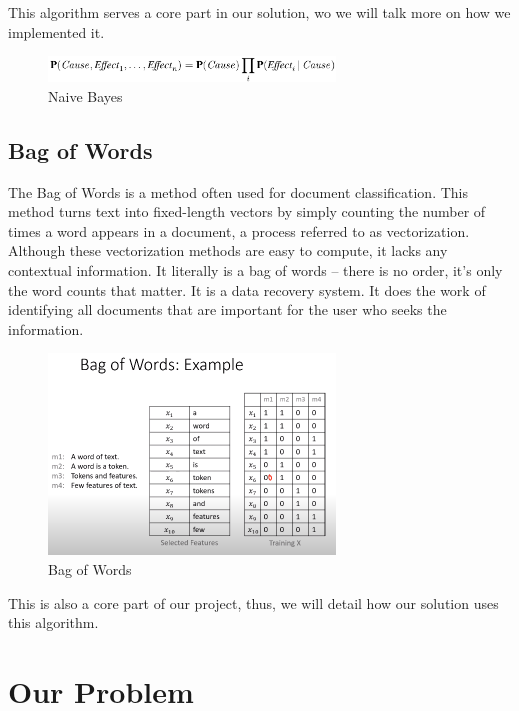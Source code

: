 \documentclass[sigconf,12pt,review=false,natbib=false]{acmart}
\begin{document}
This algorithm serves a core part in our solution, wo we will talk more on how we implemented it. \\

\begin{figure}[h!]
    \centering
    \includegraphics[width=3in]{naive_bayes}
    \caption{Naive Bayes}
    \label{fig:naive_bayes}
\end{figure}

\subsection{Bag of Words}

The Bag of Words is a method often used for document classification. This method turns text into fixed-length
vectors by simply counting the number of times a word appears in a document, a process referred to as vectorization. \\

Although these vectorization methods are easy to compute, it lacks any contextual information. It literally is a bag
of words – there is no order, it’s only the word counts that matter. It is a data recovery
system. It does the work of identifying all documents that are important for the user who  seeks the information. \\

\begin{figure}[h!]
    \centering
    \includegraphics[width=3in]{bow}
    \caption{Bag of Words}
    \label{fig:bow}
\end{figure}

This is also a core part of our project, thus, we will detail how our solution uses this algorithm. \\

\section{Our Problem}
\end{document}
